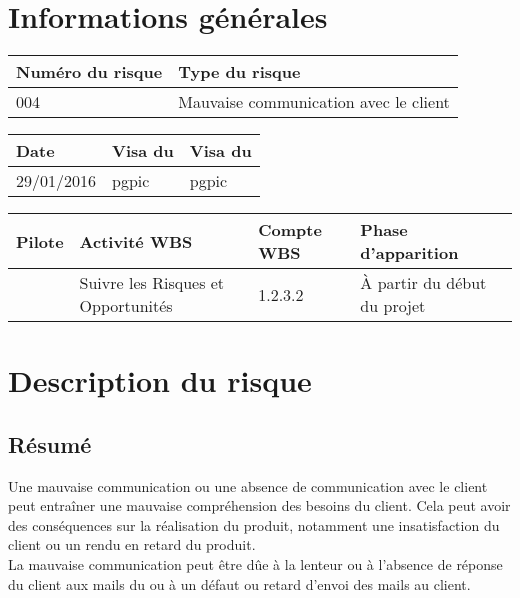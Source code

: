 \section*{Informations générales}
 
\begin{table}[H]
\centering
	\begin{tabularx}{16.8cm}{|X|X|}
	\hline
	\rowcolor{gray!40} Numéro du risque & Type du risque \\
	\hline
	004 & Mauvaise communication avec le client \\
	\hline
	\end{tabularx}
\end{table}

\begin{table}[H]
\centering
	\begin{tabularx}{16.8cm}{|X|X|X|}
	\hline
	\rowcolor{gray!40} Date & Visa du \RQ & Visa du \CP \\
	\hline
	 29/01/2016 & pgpic & pgpic \\
	\hline
	\end{tabularx}
\end{table}

\begin{table}[H]
\centering
	\begin{tabularx}{16.8cm}{|X|X|X|X|}
	\hline
	\rowcolor{gray!40} Pilote & Activité WBS & Compte WBS & Phase d'apparition \\
	\hline
	 \Julie & Suivre les Risques et Opportunités & 1.2.3.2 & À partir du début du projet\\
	\hline
	\end{tabularx}
\end{table}

\section*{Description du risque}

\subsection*{Résumé}
	Une mauvaise communication ou une absence de communication avec le client peut entraîner une mauvaise compréhension des besoins du client. Cela peut avoir des conséquences sur la réalisation du produit, notamment une insatisfaction du client ou un rendu en retard du produit. \\
	La mauvaise communication peut être dûe à la lenteur ou à l'absence de réponse du client aux mails du \CP{} ou à un défaut ou retard d'envoi des mails au client.
